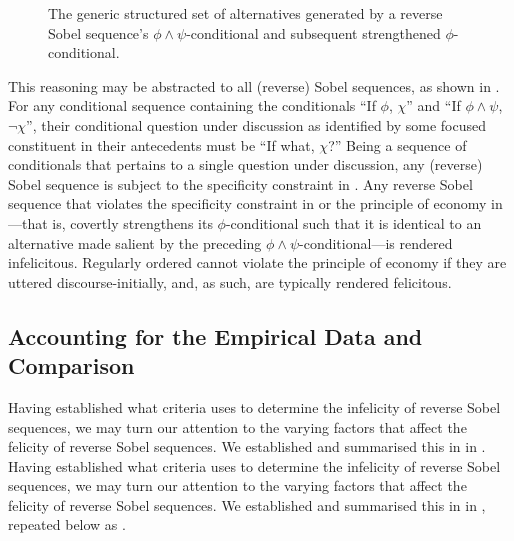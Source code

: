 \begin{figure}[!htb]
    \centering\hspace{-6cm}
    
    \caption{The generic structured set of alternatives generated by a reverse Sobel sequence's $\phi\land\psi$-conditional and subsequent strengthened $\phi$-conditional.}
\end{figure}
This reasoning may be abstracted to all (reverse) Sobel sequences, as shown in . For any conditional sequence containing the conditionals \enquote{If $\phi$, $\chi$} and \enquote{If $\phi\land\psi$, $\neg\chi$}, their conditional question under discussion as identified by some focused constituent in their antecedents must be \enquote{If what, $\chi$?} \parencite[p. 650]{Ippolito2020} Being a sequence of conditionals that pertains to a single question under discussion, any (reverse) Sobel sequence is subject to the specificity constraint in . Any reverse Sobel sequence that violates the specificity constraint in  or the principle of economy in ---that is, covertly strengthens its $\phi$-conditional such that it is identical to an alternative made salient by the preceding $\phi\land\psi$-conditional---is rendered infelicitous. Regularly ordered cannot violate the principle of economy if they are uttered discourse-initially, and, as such, are typically rendered felicitous.


\subsection{Accounting for the Empirical Data and Comparison}
Having established what criteria \textcite{Ippolito2020} uses to determine the infelicity of reverse Sobel sequences, we may turn our attention to the varying factors that affect the felicity of reverse Sobel sequences. We established and summarised this in  in . Having established what criteria \textcite{Ippolito2020} uses to determine the infelicity of reverse Sobel sequences, we may turn our attention to the varying factors that affect the felicity of reverse Sobel sequences. We established and summarised this in  in , repeated below as .
\begin{table}[!htb]
\end{table}

